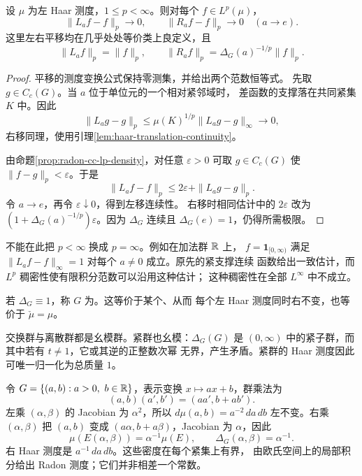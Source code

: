 \begin{proposition}[平移在积分范数中的连续性]
\label{prop:haar-lp-translation-continuity}
设 $\mu$ 为左 Haar 测度，$1\le p<\infty$。则对每个 $f\in L^p(\mu)$，
\[
 \|L_af-f\|_p\longrightarrow0,\qquad
 \|R_af-f\|_p\longrightarrow0\quad(a\to e).
\]
这里左右平移均在几乎处处等价类上良定义，且
\[
 \|L_af\|_p=\|f\|_p,\qquad
 \|R_af\|_p=\Delta_G(a)^{-1/p}\|f\|_p.
\]
\end{proposition}
\begin{proof}
平移的测度变换公式保持零测集，并给出两个范数恒等式。
先取 $g\in C_c(G)$。当 $a$ 位于单位元的一个相对紧邻域时，
差函数的支撑落在共同紧集 $K$ 中。因此
\[
 \|L_ag-g\|_p\le\mu(K)^{1/p}\|L_ag-g\|_\infty\longrightarrow0,
\]
右移同理，使用引理\ref{lem:haar-translation-continuity}。

由命题\ref{prop:radon-cc-lp-density}，对任意 $\varepsilon>0$ 可取
$g\in C_c(G)$ 使 $\|f-g\|_p<\varepsilon$。于是
\[
 \|L_af-f\|_p\le2\varepsilon+\|L_ag-g\|_p.
\]
令 $a\to e$，再令 $\varepsilon\downarrow0$，得到左移连续性。
右移时相同估计中的 $2\varepsilon$ 改为
$(1+\Delta_G(a)^{-1/p})\varepsilon$。因为 $\Delta_G$ 连续且
$\Delta_G(e)=1$，仍得所需极限。
\end{proof}

不能在此把 $p<\infty$ 换成 $p=\infty$。例如在加法群 $\mathbb{R}$ 上，
$f=\mathbf1_{[0,\infty)}$ 满足
$\|L_af-f\|_\infty=1$ 对每个 $a\ne0$ 成立。原先的紧支撑连续
函数给出一致估计，而 $L^p$ 稠密性使有限积分范数可以沿用这种估计；
这种稠密性在全部 $L^\infty$ 中不成立。

\begin{definition}
若 $\Delta_G\equiv1$，称 $G$ 为。这等价于某个、从而
每个左 Haar 测度同时右不变，也等价于 $\check\mu=\mu$。
\end{definition}

交换群与离散群都是幺模群。紧群也幺模：$\Delta_G(G)$ 是
$(0,\infty)$ 中的紧子群，而其中若有 $t\ne1$，它或其逆的正整数次幂
无界，产生矛盾。紧群的 Haar 测度因此可唯一归一化为总质量 $1$。

\begin{example}[非幺模的仿射群]
令 $G=\{(a,b):a>0,\ b\in\R\}$，表示变换 $x\mapsto ax+b$，群乘法为
\[
 (a,b)(a',b')=(aa',b+ab').
\]
左乘 $(\alpha,\beta)$ 的 Jacobian 为 $\alpha^2$，所以
$d\mu(a,b)=a^{-2}\,da\,db$ 左不变。右乘 $(\alpha,\beta)$ 把
$(a,b)$ 变成 $(a\alpha,b+a\beta)$，Jacobian 为 $\alpha$，因此
\[
 \mu(E(\alpha,\beta))=\alpha^{-1}\mu(E),\qquad
 \Delta_G(\alpha,\beta)=\alpha^{-1}.
\]
右 Haar 测度是 $a^{-1}\,da\,db$。这些密度在每个紧集上有界，
由欧氏空间上的局部积分给出 Radon 测度；它们并非相差一个常数。
\end{example}

